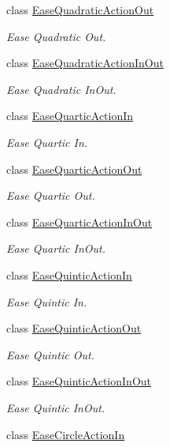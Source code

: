 \begin{DoxyCompactItemize}
class \hyperlink{classEaseQuadraticActionOut}{Ease\+Quadratic\+Action\+Out}
\begin{DoxyCompactList}\small\item\em Ease Quadratic Out. \end{DoxyCompactList}\item 
class \hyperlink{classEaseQuadraticActionInOut}{Ease\+Quadratic\+Action\+In\+Out}
\begin{DoxyCompactList}\small\item\em Ease Quadratic In\+Out. \end{DoxyCompactList}\item 
class \hyperlink{classEaseQuarticActionIn}{Ease\+Quartic\+Action\+In}
\begin{DoxyCompactList}\small\item\em Ease Quartic In. \end{DoxyCompactList}\item 
class \hyperlink{classEaseQuarticActionOut}{Ease\+Quartic\+Action\+Out}
\begin{DoxyCompactList}\small\item\em Ease Quartic Out. \end{DoxyCompactList}\item 
class \hyperlink{classEaseQuarticActionInOut}{Ease\+Quartic\+Action\+In\+Out}
\begin{DoxyCompactList}\small\item\em Ease Quartic In\+Out. \end{DoxyCompactList}\item 
class \hyperlink{classEaseQuinticActionIn}{Ease\+Quintic\+Action\+In}
\begin{DoxyCompactList}\small\item\em Ease Quintic In. \end{DoxyCompactList}\item 
class \hyperlink{classEaseQuinticActionOut}{Ease\+Quintic\+Action\+Out}
\begin{DoxyCompactList}\small\item\em Ease Quintic Out. \end{DoxyCompactList}\item 
class \hyperlink{classEaseQuinticActionInOut}{Ease\+Quintic\+Action\+In\+Out}
\begin{DoxyCompactList}\small\item\em Ease Quintic In\+Out. \end{DoxyCompactList}\item 
class \hyperlink{classEaseCircleActionIn}{Ease\+Circle\+Action\+In}

\end{DoxyCompactItemize}
